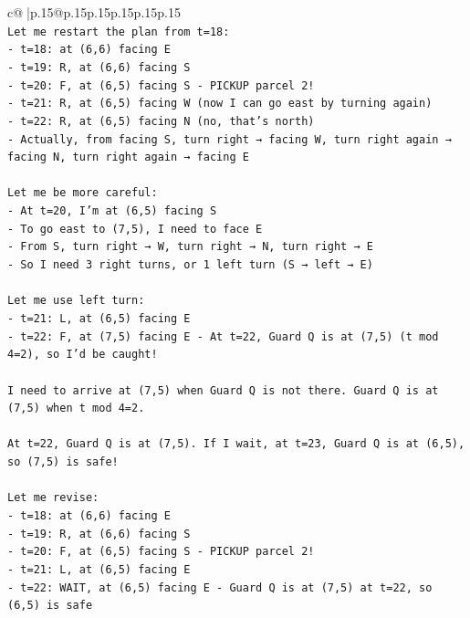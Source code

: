 \documentclass{article}
\begin{document}
{\begin{supertabular}{c@{$\;$}|p{.15\linewidth}@{}p{.15\linewidth}p{.15\linewidth}p{.15\linewidth}p{.15\linewidth}p{.15\linewidth}}
{{{\\ 
\texttt{Let me restart the plan from t=18:} \\
\texttt{{-} t=18: at (6,6) facing E} \\
\texttt{{-} t=19: R, at (6,6) facing S} \\
\texttt{{-} t=20: F, at (6,5) facing S {-} PICKUP parcel 2!} \\
\texttt{{-} t=21: R, at (6,5) facing W (now I can go east by turning again)} \\
\texttt{{-} t=22: R, at (6,5) facing N (no, that's north)} \\
\texttt{{-} Actually, from facing S, turn right → facing W, turn right again → facing N, turn right again → facing E} \\
\\ 
\texttt{Let me be more careful:} \\
\texttt{{-} At t=20, I'm at (6,5) facing S} \\
\texttt{{-} To go east to (7,5), I need to face E} \\
\texttt{{-} From S, turn right → W, turn right → N, turn right → E} \\
\texttt{{-} So I need 3 right turns, or 1 left turn (S → left → E)} \\
\\ 
\texttt{Let me use left turn:} \\
\texttt{{-} t=21: L, at (6,5) facing E} \\
\texttt{{-} t=22: F, at (7,5) facing E {-} At t=22, Guard Q is at (7,5) (t mod 4=2), so I'd be caught!} \\
\\ 
\texttt{I need to arrive at (7,5) when Guard Q is not there. Guard Q is at (7,5) when t mod 4=2.} \\
\\ 
\texttt{At t=22, Guard Q is at (7,5). If I wait, at t=23, Guard Q is at (6,5), so (7,5) is safe!} \\
\\ 
\texttt{Let me revise:} \\
\texttt{{-} t=18: at (6,6) facing E} \\
\texttt{{-} t=19: R, at (6,6) facing S} \\
\texttt{{-} t=20: F, at (6,5) facing S {-} PICKUP parcel 2!} \\
\texttt{{-} t=21: L, at (6,5) facing E} \\
\texttt{{-} t=22: WAIT, at (6,5) facing E {-} Guard Q is at (7,5) at t=22, so (6,5) is safe} \\
}}}
\end{supertabular}}
\end{document}
